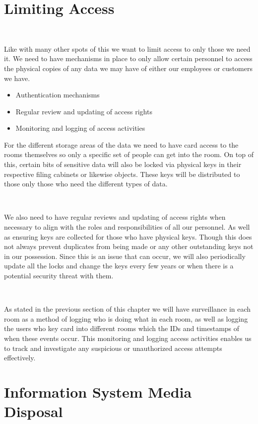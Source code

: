 \documentclass[12pt,a4paper]{report}
\begin{document}
\section{Limiting Access}
\

Like with many other spots of this we want to limit access to only those we need it.
We need to have mechanisms in place to only allow certain personnel to access the physical copies of any data we may have of either our employees or customers we have.
\begin{itemize}
 \item Authentication mechanisms 
 \item Regular review and updating of access rights
 \item Monitoring and logging of access activities
\end{itemize}

For the different storage areas of the data we need to have card access to the rooms themselves so only a specific set of people can get into the room.
On top of this, certain bits of sensitive data will also be locked via physical keys in their respective filing cabinets or likewise objects.
These keys will be distributed to those only those who need the different types of data.

\

We also need to have regular reviews and updating of access rights when necessary to align with the roles and responsibilities of all our personnel. 
As well as ensuring keys are collected for those who have physical keys.
Though this does not always prevent duplicates from being made or any other outstanding keys not in our possession.
Since this is an issue that can occur, we will also periodically update all the locks and change the keys every few years or when there is a potential security threat with them.

\

As stated in the previous section of this chapter we will have surveillance in each room as a method of logging who is doing what in each room, as well as logging the users who key card into different rooms which the IDs and timestamps of when these events occur. 
This monitoring and logging access activities enables us to track and investigate any suspicious or unauthorized access attempts effectively.


\section{Information System Media Disposal}
\
\end{document}
